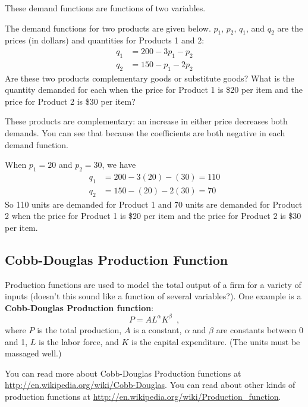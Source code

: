 These demand functions are functions of two variables.

\begin{example}
The demand functions for two products are given below. $p_1$, $p_2$, $q_1$, and $q_2$ are the prices (in dollars) and quantities for Products 1 and 2:
\begin{align*}
q_1 &= 200-3p_1-p_2\\
q_2 &= 150-p_1-2p_2
\end{align*}
Are these two products complementary goods or substitute goods? What is the quantity demanded for each when the price for Product 1 is \$20 per item and the price for Product 2 is \$30 per item?

\begin{solution} These products are complementary: an increase in either price decreases both demands. You can see that because the coefficients are both negative in each demand function.

When $p_1=20$ and $p_2=30$, we have
\begin{align*}
q_1 &= 200-3(20)-(30)=110\\
q_2 &= 150-(20)-2(30)=70
\end{align*}
So 110 units are demanded for Product 1 and 70 units are demanded for Product 2 when the price for Product 1 is \$20 per item and the price for Product 2 is \$30 per item.
\end{solution}\end{example}

\subsection{Cobb-Douglas Production Function}
\label{ssec:cobb-douglas}
Production functions are used to model the total output of a firm for a variety of inputs (doesn't this sound like a function of several variables?). One example is a {\bf Cobb-Douglas Production function}:
$$P=AL^{\alpha}K^{\beta} \enspace ,$$
where $P$ is the total production, $A$ is a constant, $\alpha$ and $\beta$ are constants between 0 and 1, $L$ is the labor force, and $K$ is the capital expenditure. (The units must be massaged well.)

You can read more about Cobb-Douglas Production functions at \url{http://en.wikipedia.org/wiki/Cobb-Douglas}. You can read about other kinds of production functions at \url{http://en.wikipedia.org/wiki/Production_function}.
